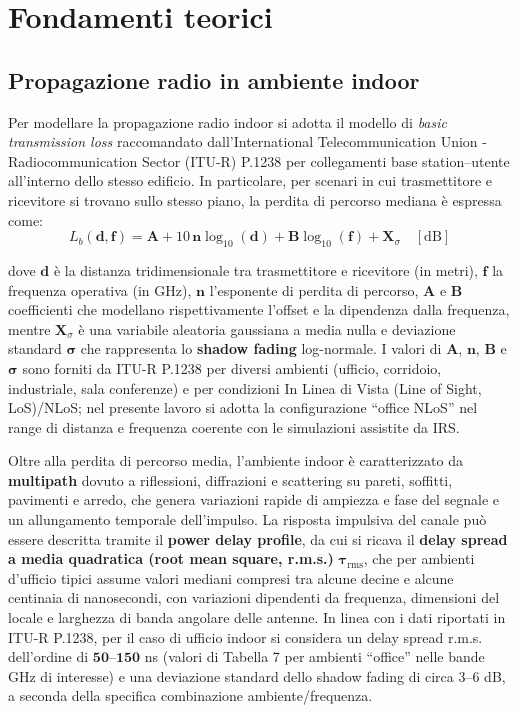 \documentclass[12pt,a4paper]{report}
\begin{document}
\chapter{Fondamenti teorici}
\label{chap:fondamenti}

\section{Propagazione radio in ambiente indoor}
\label{sec:propagazione_indoor}
Per modellare la propagazione radio indoor si adotta il modello di
\emph{basic transmission loss} raccomandato dall'International
Telecommunication Union - Radiocommunication Sector (ITU-R) P.1238
\cite{itu_p1238_2025} per collegamenti base station--utente
all'interno dello stesso edificio. In particolare, per scenari in cui
trasmettitore e ricevitore si trovano sullo stesso piano, la perdita
di percorso mediana è espressa come:
\begin{equation}
  L_b(\mathbf{d},\mathbf{f}) = \mathbf{A} + 10\,\mathbf{n}
  \log_{10}(\mathbf{d}) + \mathbf{B} \log_{10}(\mathbf{f}) +
  \mathbf{X}_\sigma \quad [\text{dB}]
  \label{eq:itu_loss}
\end{equation}

dove $\mathbf{d}$ è la distanza tridimensionale tra trasmettitore e
ricevitore (in metri), $\mathbf{f}$ la frequenza operativa (in GHz),
$\mathbf{n}$ l'esponente di perdita di percorso, $\mathbf{A}$ e
$\mathbf{B}$ coefficienti che modellano rispettivamente l'offset e la
dipendenza dalla frequenza, mentre $\mathbf{X}_\sigma$ è una
variabile aleatoria gaussiana a media nulla e deviazione standard
$\boldsymbol{\sigma}$ che rappresenta lo \textbf{shadow fading}
log-normale. I valori di $\mathbf{A}$, $\mathbf{n}$, $\mathbf{B}$ e
$\boldsymbol{\sigma}$ sono forniti da ITU-R P.1238 per diversi
ambienti (ufficio, corridoio, industriale, sala conferenze) e per
condizioni In Linea di Vista (Line of Sight, LoS)/NLoS; nel presente
lavoro si adotta la configurazione ``office NLoS'' nel range di
distanza e frequenza coerente con le simulazioni assistite da IRS.

Oltre alla perdita di percorso media, l'ambiente indoor è
caratterizzato da \textbf{multipath} dovuto a riflessioni,
diffrazioni e scattering su pareti, soffitti, pavimenti e arredo, che
genera variazioni rapide di ampiezza e fase del segnale e un
allungamento temporale dell'impulso. La risposta impulsiva del canale
può essere descritta tramite il \textbf{power delay profile}, da cui
si ricava il \textbf{delay spread a media quadratica (root mean
square, r.m.s.)} $\boldsymbol{\tau}_{\mathrm{rms}}$, che per ambienti
d'ufficio tipici assume valori mediani compresi tra alcune decine e
alcune centinaia di nanosecondi, con variazioni dipendenti da
frequenza, dimensioni del locale e larghezza di banda angolare delle
antenne. In linea con i dati riportati in ITU-R P.1238, per il caso
di ufficio indoor si considera un delay spread r.m.s. dell'ordine di
$\mathbf{50}$--$\mathbf{150}$ ns (valori di Tabella 7 per ambienti
``office'' nelle bande GHz di interesse) e una deviazione standard
dello shadow fading di circa 3--6 dB, a seconda della specifica
combinazione ambiente/frequenza.
\end{document}
